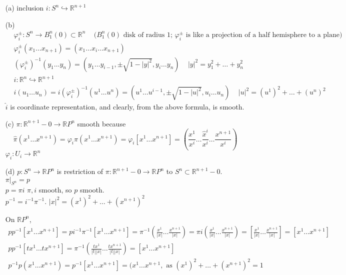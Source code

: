 \begin{enumerate}
\item[(a)] inclusion $i: S^n \hookrightarrow \mathbb{R}^{n+1}$ 
\item[(b)]
\[
\begin{aligned}
  & \varphi_i^{\pm}:S^n \to B_1^n(0) \subset \mathbb{R}^n \quad \, \text{($B_1^n(0)$ disk of radius 1; $\varphi_i^{\pm} $ is like a projection of a half hemisphere to a plane)} \\
  & \varphi_i^{\pm}(x_1 \dots x_{n+1}) = (x_1 \dots \widehat{x}_i \dots x_{n+1} ) \\ 
  & (\varphi_i^{\pm})^{-1}(y_1 \dots y_n) = (y_1 \dots y_{i-1}, \pm \sqrt{ 1 - |y|^2 } , y_i \dots y_n ) \quad \, |y|^2 = y_1^2 + \dots + y_n^2 
\end{aligned}
\]
\[
\begin{aligned}
  & \widehat{i} : \mathbb{R}^n \hookrightarrow \mathbb{R}^{n+1} \\ 
  & \widehat{i}(u_1 \dots u_n) = i (\varphi_i^{\pm})^{-1}(u^1 \dots u^n) = (u^1 \dots u^{i-1}, \pm \sqrt{ 1 - |u|^2 } , u_i \dots u_n )  \quad \, |u|^2 =  (u^1)^2  + \dots + (u^n)^2 
\end{aligned}
\]
$\widehat{i}$ is coordinate representation, and clearly, from the above formula, is smooth.  
\item[(c)] $\pi : \mathbb{R}^{n+1} - 0 \to \mathbb{R}P^n$ smooth because
\[
\widehat{\pi}(x^1 \dots x^{n+1})  = \varphi_i \pi(x^1 \dots x^{n+1}) = \varphi_i[x^1 \dots x^{n+1}] = \left( \frac{x^1 }{ x^i } \dots \frac{ \widehat{x}^i}{ x^i } \dots \frac{x^{n+1}}{ x^i } \right)
\]
$\varphi_i : U_i \to \mathbb{R}^n$
\item[(d)] $p : S^n \to \mathbb{R}P^n$ is restriction of $\pi: \mathbb{R}^{n+1} - 0 \to \mathbb{R}P^n$ to $S^n \subset \mathbb{R}^{n+1} -0$.  $\left. \pi \right|_{S^n} = p$ \\
$p = \pi i$ $\pi,i$ smooth, so $p$ smooth.  \\
$p^{-1} = i^{-1} \pi^{-1}$.  $|x|^2 = (x^1)^2 + \dots + (x^{n+1})^2$

On $\mathbb{R}P^n$,
\[
\begin{gathered}
  pp^{-1}[x^1 \dots x^{n+1} ] = p i^{-1} \pi^{-1}[x^1 \dots x^{n+1} ] = \pi^{-1}\left( \frac{x^1}{ |x| } \dots \frac{x^{n+1}}{ |x| } \right) = \pi i\left( \frac{x^1}{|x|} \dots \frac{x^{n+1}}{ |x|} \right) = \left[ \frac{x^1}{ |x|} \dots \frac{x^{n+1}}{ |x|} \right] = [x^1 \dots x^{n+1} ] \\
  pp^{-1}[tx^1 \dots tx^{n+1} ] = \pi^{-1}\left( \frac{tx^1}{ |t||x|} \dots \frac{t x^{n+1}}{ |t||x| } \right) = [x^1 \dots x^{n+1} ] \\ 
   p^{-1}p(x^1 \dots x^{n+1} ) = p^{-1}[x^1 \dots x^{n+1}] = (x^1 \dots x^{n+1}, \text{ as } (x^1)^2 + \dots + (x^{n+1})^2 = 1
\end{gathered}
\]


\end{enumerate}
